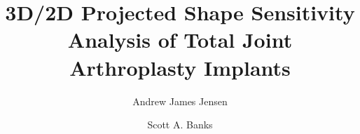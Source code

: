 \documentclass[preprint,12pt]{elsarticle}
\begin{document}
\begin{frontmatter}
	\title{3D/2D Projected Shape Sensitivity Analysis of Total Joint Arthroplasty Implants}
	\author[a]{Andrew James Jensen}
	\author[a]{Scott A. Banks}
	

\end{frontmatter}










\end{document}
